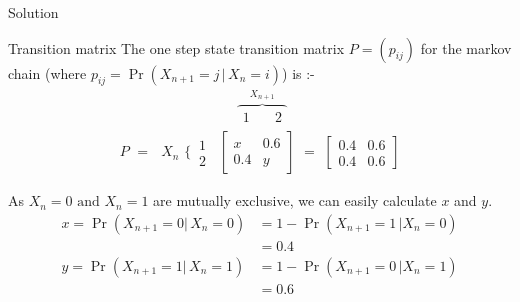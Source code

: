 \documentclass{beamer}
\providecommand{\pr}[1]{\ensuremath{\Pr\left(#1\right)}}
\begin{document}
\begin{frame}{Solution}
\begin{block}{Transition matrix}
The one step state transition matrix $P=(p_{ij})$ for the markov chain (where $p_{ij}=\pr{X_{n+1}=j\, |\, X_{n}=i}$) is :-
\begin{align}
\,\,\overbrace{
 \begin{matrix}
1 & \,\,\,\,\,\,2
\end{matrix}\nonumber}^{X_{n+1}}\nonumber
\end{align}
\vspace{-1cm}
\begin{align}
P\,\,=\,\,\,\,\scriptstyle{X_n\,\,} \bigg\{ \, \begin{matrix} 1\\ 2 \end{matrix}\,\,\,
 \begin{bmatrix}
x & 0.6 \\
0.4 & y 
\end{bmatrix}\,\,=\,\,
\begin{bmatrix}
0.4 & 0.6 \\
0.4 & 0.6 
\end{bmatrix}
\end{align}
\end{block}
As $X_n=0 \text{ and } X_n=1$ are mutually exclusive, we can easily calculate $x$ and $y$.
\begin{align}
   x=\pr{X_{n+1} = 0 |\, X_{n}=0} &= 1-\pr{X_{n+1} = 1 \,| X_{n}=0}\nonumber
    \\&= 0.4 \label{x}\\
    y=\pr{X_{n+1} = 1 |\, X_{n}=1} &= 1-\pr{X_{n+1} = 0 \,| X_{n}=1}\nonumber
    \\&= 0.6 \label{y}
\end{align}
\end{frame}
\end{document}

